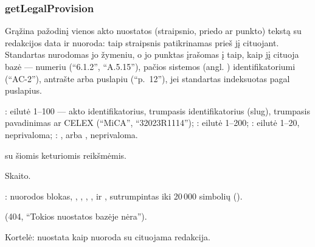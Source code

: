\subsubsection{getLegalProvision}\label{sec:tools:getLegalProvision}
\begin{description}[style=multiline, leftmargin=19mm, labelwidth=17mm, labelsep=2mm,
  font=\sffamily\bfseries\footnotesize\color{ink}, itemsep=1pt, topsep=2pt, before=\raggedright]
  \item[Paskirtis] Grąžina pažodinį vienos akto nuostatos (straipsnio, priedo ar punkto) tekstą
    su redakcijos data ir nuoroda: taip straipsnis patikrinamas prieš jį cituojant. Standartas
    nurodomas jo žymeniu, o jo punktas įrašomas į  taip, kaip jį cituoja bazė ---
    numeriu (\enquote{6.1.2}, \enquote{A.5.15}), pačios sistemos (angl. )
    identifikatoriumi (\enquote{AC-2}), antrašte arba puslapiu (\enquote{p.~12}), jei
    standartas indeksuotas pagal puslapius.
  \item[Įvestis] : eilutė 1--100 --- akto identifikatorius, trumpasis
    identifikatorius (slug), trumpasis pavadinimas ar CELEX (\enquote{MiCA},
    \enquote{32023R1114}); : eilutė 1--200; : eilutė 1--20,
    neprivaloma; : ,  arba , neprivaloma.
  \item[Užklausos]  su šiomis keturiomis reikšmėmis.
  \item[Pobūdis] Skaito.
  \item[Grąžina] : nuorodos blokas, , ,
    , ,  ir , sutrumpintas iki
    20\,000 simbolių ().
  \item[Klaidos]  (404, \enquote{Tokios nuostatos bazėje nėra}).
  \item[Konsolė] Kortelė: nuostata kaip nuoroda su cituojama redakcija.
\end{description}

